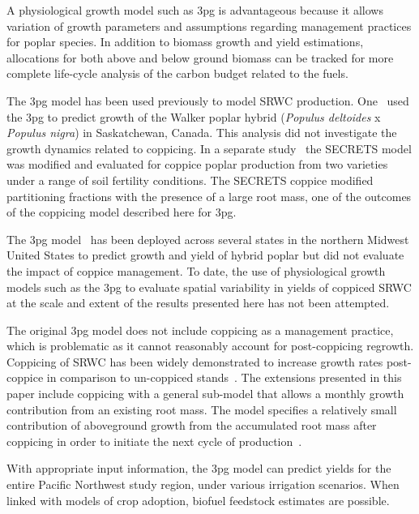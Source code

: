\documentclass[preprint,review,12pt]{elsarticle}
\begin{document}
A physiological growth model such as \ac{3pg} is advantageous because
it allows variation of growth parameters and assumptions regarding
management practices for poplar species.  In addition to biomass
growth and yield estimations, allocations for both above and below
ground biomass can be tracked for more complete life-cycle analysis of
the carbon budget related to the fuels.

The \ac{3pg} model has been used previously to model \ac{SRWC}
production. One~\cite{Amichev2010} used the \ac{3pg} to predict growth
of the Walker poplar hybrid (\textit{Populus deltoides} x
\textit{Populus nigra}) in Saskatchewan, Canada. This analysis did not
investigate the growth dynamics related to coppicing. In a separate
study~\cite{Deckmyn2004} the \ac{SECRETS} model was modified and
evaluated for coppice poplar production from two varieties under a
range of soil fertility conditions.  The \ac{SECRETS} coppice modified
partitioning fractions with the presence of a large root mass, one of
the outcomes of the coppicing model described here for \ac{3pg}.

The \ac{3pg} model~\cite{Headlee2012} has been deployed across several
states in the northern Midwest United States to predict growth and
yield of hybrid poplar but did not evaluate the impact of coppice
management.  To date, the use of physiological growth models such as
the \ac{3pg} to evaluate spatial variability in yields of coppiced
\ac{SRWC} at the scale and extent of the results presented here has
not been attempted.

The original \ac{3pg} model does not include coppicing as a management
practice, which is problematic as it cannot reasonably account for
post-coppicing regrowth.  Coppicing of \ac{SRWC} has been widely
demonstrated to increase growth rates post-coppice in comparison to
un-coppiced stands~\cite{Verwijst1996,Afas2008a,Sennerby-Forsse1992}.
The extensions presented in this paper include coppicing with a
general sub-model that allows a monthly growth contribution from an
existing root mass.  The model specifies a relatively small
contribution of aboveground growth from the accumulated root mass
after coppicing in order to initiate the next cycle of
production~\cite{Deckmyn2004}.

With appropriate input information, the \ac{3pg} model can predict
yields for the entire Pacific Northwest study region, under various
irrigation scenarios.  When linked with models of crop adoption,
biofuel feedstock estimates are possible.
\end{document}
